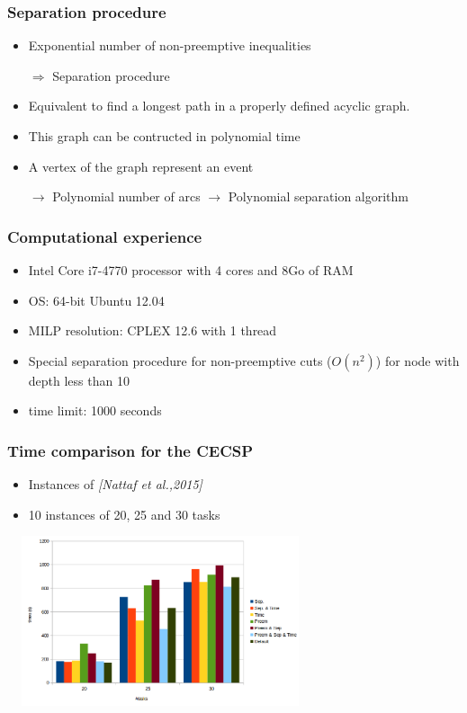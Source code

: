 \begin{frame}
\frametitle{Separation procedure}
\vfill
\begin{itemize}
\item  Exponential number of non-preemptive inequalities

\pause
$\Rightarrow$ Separation procedure
\vfill
\pause
\item Equivalent to find a longest path in a properly defined acyclic
  graph. 
\vfill
\pause
\item This graph can be contructed in polynomial time
\vfill
\pause
\item A vertex of the graph represent an event
 \vspace{0.3cm}

 $\longrightarrow$ Polynomial number of arcs 
 \vfill 
 $\longrightarrow$ Polynomial separation algorithm
\end{itemize}
\end{frame}

\begin{frame}
\frametitle{Computational experience}
\begin{itemize}
\vfill
\item Intel Core i7-4770 processor with 4 cores and 8Go of RAM
\vfill
\item OS: 64-bit Ubuntu 12.04
\vfill
\item MILP resolution: CPLEX 12.6 with 1 thread  
\vfill
\item Special separation procedure for non-preemptive cuts ($O(n^2)$)
  for node with depth less than 10
\vfill
\item time limit: 1000 seconds
\vfill
\end{itemize}
\end{frame}

\begin{frame}
\frametitle{Time comparison for the CECSP}
\begin{itemize}
\item Instances of {\it [Nattaf et al.,2015]}
\item 10 instances of 20, 25 and 30 tasks
\end{itemize}
\vfill
\begin{center}
\includegraphics[height=5cm, width=9cm]{time_CECSP.png}
\end{center}
\end{frame}


